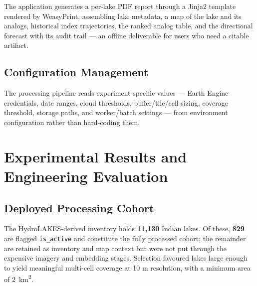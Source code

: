 \documentclass[12pt,a4paper,oneside]{report}
\newcommand{\code}[1]{\texttt{#1}}
\begin{document}
The application generates a per-lake PDF report through a Jinja2
template rendered by WeasyPrint, assembling lake metadata, a map of
the lake and its analogs, historical index trajectories, the ranked
analog table, and the directional forecast with its audit trail ---
an offline deliverable for users who need a citable artifact.

\section{Configuration Management}

The processing pipeline reads experiment-specific values --- Earth
Engine credentials, date ranges, cloud thresholds, buffer/tile/cell
sizing, coverage threshold, storage paths, and worker/batch settings
--- from environment configuration rather than hard-coding them.


\chapter{Experimental Results and Engineering Evaluation}
\label{chap:results}

\section{Deployed Processing Cohort}

The HydroLAKES-derived inventory holds \textbf{11{,}130} Indian
lakes. Of these, \textbf{829} are flagged \code{is\_active} and
constitute the fully processed cohort; the remainder are retained as
inventory and map context but were not put through the expensive
imagery and embedding stages. Selection favoured lakes large enough
to yield meaningful multi-cell coverage at 10 m resolution, with a
minimum area of \SI{2}{\kilo\meter\squared}.
\end{document}
